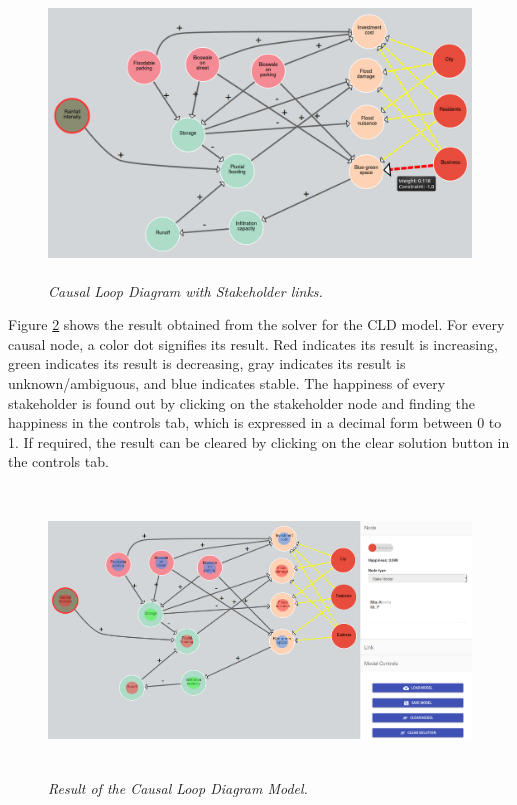 \documentclass[a4paper]{article}
\begin{document}
\begin{figure}[H]
\begin{center}
\includegraphics[height=3in,width=5in]{img/cld2.png}
\caption{\small \sl Causal Loop Diagram with Stakeholder links.\label{fig:cld2}}
\end{center}
\end{figure}

Figure \ref{fig:result} shows the result obtained from the solver for the CLD model. For every causal node, a color dot signifies its result. Red indicates its result is increasing, green indicates its result is decreasing, gray indicates its result is unknown/ambiguous, and blue indicates stable. The happiness of every stakeholder is found out by clicking on the stakeholder node and finding the happiness in the controls tab, which is expressed in a decimal form between 0 to 1. If required, the result can be cleared by clicking on the clear solution button in the controls tab.

\begin{figure}[H]
\begin{center}
\includegraphics[height=3in,width=5in]{img/result.png}
\caption{\small \sl Result of the Causal Loop Diagram Model.\label{fig:result}}
\end{center}
\end{figure}
\end{document}
